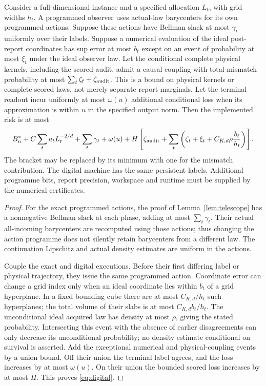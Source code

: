 \begin{proposition}\label{prop:digital}
Consider a full-dimensional instance and a specified allocation $L_t$, with grid widths $h_t$. A programmed observer uses actual-law barycenters for its own programmed actions. Suppose these actions have Bellman slack at most $\gamma_t$ uniformly over their labels. Suppose a numerical evaluation of the ideal post-report coordinates has sup error at most $b_t$ except on an event of probability at most $\xi_t$ under the ideal observer law. Let the conditional complete physical kernels, including the scored audit, admit a causal coupling with total mismatch probability at most $\sum_t\zeta_t+\zeta_{\rm audit}$. This is a bound on physical kernels or complete scored laws, not merely separate report marginals. Let the terminal readout incur uniformly at most $\omega(u)$ additional conditional loss when its approximation is within $u$ in the specified output norm. Then the implemented risk is at most
\begin{equation}\label{eq:digital}
 B_n^*+C\sum_ta_tL_t^{-2/d}+\sum_t\gamma_t+\omega(u)
 +H\left[\zeta_{\rm audit}+\sum_t\left(\zeta_t+\xi_t+C_{K,d}\rho\frac{b_t}{h_t}\right)\right].
\end{equation}
The bracket may be replaced by its minimum with one for the mismatch contribution. The digital machine has the same persistent labels. Additional programme bits, report precision, workspace and runtime must be supplied by the numerical certificates.
\end{proposition}
\begin{proof}
For the exact programmed actions, the proof of Lemma~\ref{lem:telescope} has a nonnegative Bellman slack at each phase, adding at most $\sum_t\gamma_t$. Their actual all-incoming barycenters are recomputed using those actions; thus changing the action programme does not silently retain barycenters from a different law. The continuation Lipschitz and actual density estimates are uniform in the actions.

Couple the exact and digital executions. Before their first differing label or physical trajectory, they issue the same programmed action. Coordinate error can change a grid index only when an ideal coordinate lies within $b_t$ of a grid hyperplane. In a fixed bounding cube there are at most $C_{K,d}/h_t$ such hyperplanes; the total volume of their slabs is at most $C_{K,d}b_t/h_t$. The unconditional ideal acquired law has density at most $\rho$, giving the stated probability. Intersecting this event with the absence of earlier disagreements can only decrease its unconditional probability; no density estimate conditional on survival is asserted. Add the exceptional numerical and physical-coupling events by a union bound. Off their union the terminal label agrees, and the loss increases by at most $\omega(u)$. On their union the bounded scored loss increases by at most $H$. This proves \eqref{eq:digital}.
\end{proof}
